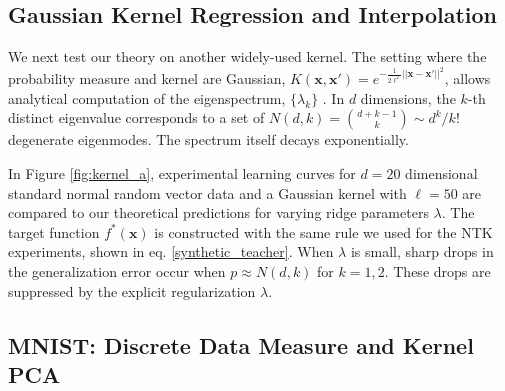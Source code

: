 \documentclass{article}
\begin{document}
\subsection{Gaussian Kernel Regression and Interpolation}

We next test our theory on another widely-used kernel. The setting where the probability measure and kernel are Gaussian, $K(\mathbf{x},\mathbf{x}') = e^{-\frac{1}{2\ell^2} ||\mathbf{x}-\mathbf{x}'||^2}$, allows analytical computation of the eigenspectrum, $\lbrace \lambda_k\rbrace$ \cite{GPMLRasmussen}. In $d$ dimensions, the $k$-th distinct eigenvalue corresponds to a set of $N(d,k) = \binom{d+k-1}{k} \sim {d^k}/{k!}$ degenerate eigenmodes. The spectrum itself decays exponentially. 

In Figure \ref{fig:kernel_a}, experimental learning curves for $d=20$ dimensional standard normal random vector data and a Gaussian kernel with $\ell = 50$ are compared to our theoretical predictions for varying ridge parameters $\lambda$. The target function $f^*(\mathbf{x})$ is constructed with the same rule we used for the NTK experiments, shown in eq. \ref{synthetic_teacher}. When $\lambda$ is small, sharp drops in the generalization error occur when $p \approx N(d,k)$ for $k=1,2$. These drops are suppressed by the explicit regularization $\lambda$. 



\subsection{MNIST: Discrete Data Measure and Kernel PCA}\label{SecMNIST}
\end{document}
